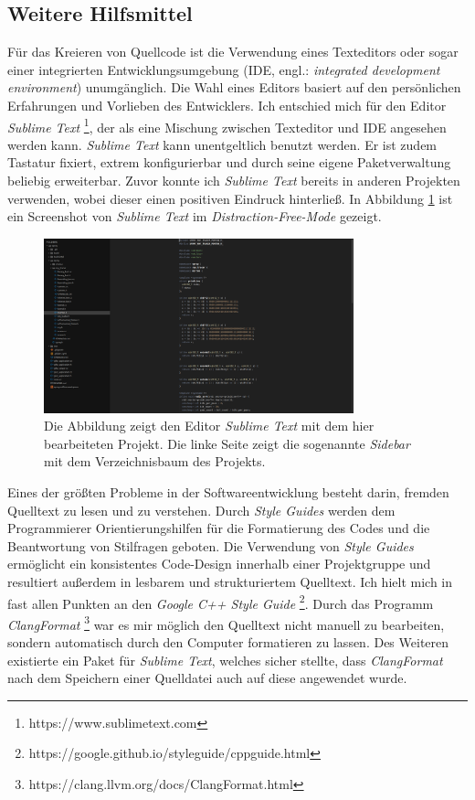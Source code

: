 \documentclass[crop=false]{standalone}
\begin{document}
  \subsection{Weitere Hilfsmittel} %
  \label{sub:weitere_hilfsmittel}
    Für das Kreieren von Quellcode ist die Verwendung eines Texteditors oder sogar einer integrierten Entwicklungsumgebung (IDE, engl.: \textit{integrated development environment}) unumgänglich.
    Die Wahl eines Editors basiert auf den persönlichen Erfahrungen und Vorlieben des Entwicklers.
    Ich entschied mich für den Editor \textit{Sublime Text}%
    \footnote{https://www.sublimetext.com}, der als eine Mischung zwischen Texteditor und IDE angesehen werden kann.
    \textit{Sublime Text} kann unentgeltlich benutzt werden.
    Er ist zudem Tastatur fixiert, extrem konfigurierbar und durch seine eigene Paketverwaltung beliebig erweiterbar.
    Zuvor konnte ich \textit{Sublime Text} bereits in anderen Projekten verwenden, wobei dieser einen positiven Eindruck hinterließ.
    In Abbildung \ref{fig:sublime-text-example} ist ein Screenshot von \textit{Sublime Text} im \textit{Distraction-Free-Mode} gezeigt.
    \begin{figure}[h]
      \center
      \includegraphics[width=0.8\textwidth]{images/sublime_text_example.png}
      \caption{%
        Die Abbildung zeigt den Editor \textit{Sublime Text} mit dem hier bearbeiteten Projekt.
        Die linke Seite zeigt die sogenannte \textit{Sidebar} mit dem Verzeichnisbaum des Projekts.
      }
      \label{fig:sublime-text-example}
    \end{figure}

    Eines der größten Probleme in der Softwareentwicklung besteht darin, fremden Quelltext zu lesen und zu verstehen.
    Durch \textit{Style Guides} werden dem Programmierer Orientierungshilfen für die Formatierung des Codes und die Beantwortung von Stilfragen geboten.
    Die Verwendung von \textit{Style Guides} ermöglicht ein konsistentes Code-Design innerhalb einer Projektgruppe und resultiert außerdem in lesbarem und strukturiertem Quelltext.
    Ich hielt mich in fast allen Punkten an den \textit{Google C++ Style Guide}%
    \footnote{https://google.github.io/styleguide/cppguide.html}.
    Durch das Programm \textit{ClangFormat}%
    \footnote{https://clang.llvm.org/docs/ClangFormat.html}
    war es mir möglich den Quelltext nicht manuell zu bearbeiten, sondern automatisch durch den Computer formatieren zu lassen.
    Des Weiteren existierte ein Paket für \textit{Sublime Text}, welches sicher stellte, dass \textit{ClangFormat} nach dem Speichern einer Quelldatei auch auf diese angewendet wurde.

\end{document}
